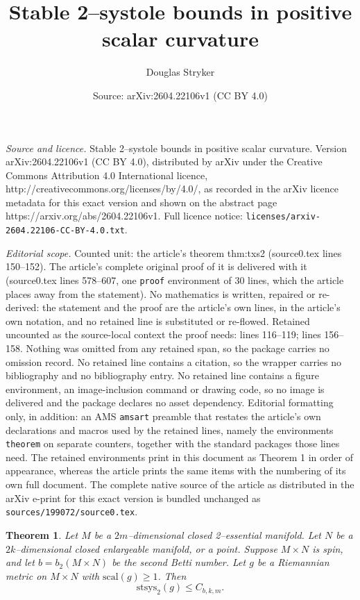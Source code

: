 \documentclass[10pt,a4paper]{amsart}
\title{Stable 2--systole bounds in positive scalar curvature}
\author{Douglas Stryker}
\date{Source: arXiv:2604.22106v1 (CC BY 4.0)}
\newtheorem{theorem}{Theorem}
\begin{document}
\maketitle

\noindent\emph{Source and licence.} Stable 2--systole bounds in positive scalar curvature. Version arXiv:2604.22106v1 (CC BY 4.0), distributed by arXiv under the Creative Commons Attribution 4.0 International licence, http://creativecommons.org/licenses/by/4.0/, as recorded in the arXiv licence metadata for this exact version and shown on the abstract page https://arxiv.org/abs/2604.22106v1. Full licence notice: \texttt{licenses/arxiv-2604.22106-CC-BY-4.0.txt}.\par\smallskip

\noindent\textit{Editorial scope.} Counted unit: the article's theorem thm:txs2 (source0.tex lines 150--152). The article's complete original proof of it is delivered with it (source0.tex lines 578--607, one \texttt{proof} environment of 30 lines, which the article places away from the statement). No mathematics is written, repaired or re-derived: the statement and the proof are the article's own lines, in the article's own notation, and no retained line is substituted or re-flowed.  Retained uncounted as the source-local context the proof needs: lines 116--119; lines 156--158.  Nothing was omitted from any retained span, so the package carries no omission record.  No retained line contains a citation, so the wrapper carries no bibliography and no bibliography entry.  No retained line contains a figure environment, an image-inclusion command or drawing code, so no image is delivered and the package declares no asset dependency.  Editorial formatting only, in addition: an AMS \texttt{amsart} preamble that restates the article's own declarations and macros used by the retained lines, namely the environments \texttt{theorem} on separate counters, together with the standard packages those lines need.  The retained environments print in this document as Theorem 1 in order of appearance, whereas the article prints the same items with the numbering of its own full document.  The complete native source of the article as distributed in the arXiv e-print for this exact version is bundled unchanged as \texttt{sources/199072/source0.tex}.
\begin{theorem}\label{thm:gen}
Let $M$ be a $2m$--dimensional closed 2--essential manifold. Let $N$ be a $2k$--dimensional closed enlargeable manifold, or a point. Suppose $M \times N$ is spin, and let $b = b_2(M \times N)$ be the second Betti number. Let $g$ be a Riemannian metric on $M \times N$ with $\mathrm{scal}(g) \geq 1$. Then
\[ \mathrm{stsys}_2(g) \leq C_{b, k, m}. \]
\end{theorem}
\end{document}
